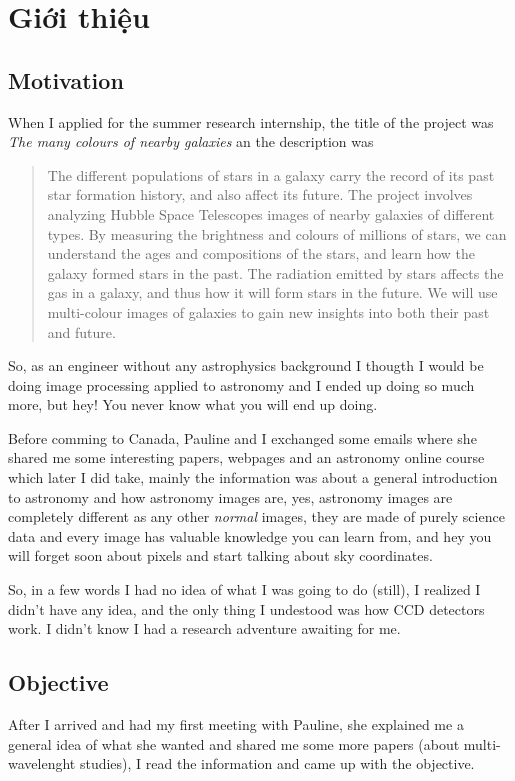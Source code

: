 
\chapter{Giới thiệu}

\section{Motivation}
When I applied for the summer research internship, the title of the project was \emph{The many colours of nearby galaxies} an the description was
\begin{quote}
The different populations of stars in a galaxy carry the record of its past star formation history, and also affect its future. The project involves  analyzing Hubble Space Telescopes images of nearby galaxies of different types. By measuring the brightness and colours of millions of stars, we can understand the ages and compositions of the stars, and learn how the galaxy formed stars in the past. The radiation emitted by stars affects the gas in a galaxy, and thus how it will form stars in the future. We will use multi-colour images of galaxies to gain new insights into both their past and future.
\end{quote}

So, as an engineer without any astrophysics background I thougth I would be doing image processing applied to astronomy and I ended up doing so much more, but hey! You never know what you will end up doing.

Before comming to Canada, Pauline and I exchanged some emails where she shared me some interesting papers, webpages and an astronomy online course which later I did take, mainly the information was about a general introduction to astronomy and how astronomy images are, yes, astronomy images are completely different as any other \emph{normal} images, they are made of purely science data and every image has valuable knowledge you can learn from, and hey you will forget soon about pixels and start talking about sky coordinates.

So, in a few words I had no idea of what I was going to do (still), I realized I didn't have any idea, and the only thing I undestood was how CCD detectors work. I didn't know I had a research adventure awaiting for me.

\section{Objective}
After I arrived and had my first meeting with Pauline, she explained me a general idea of what she wanted and shared me some more papers (about multi-wavelenght studies), I read the information and came up with the objective.

